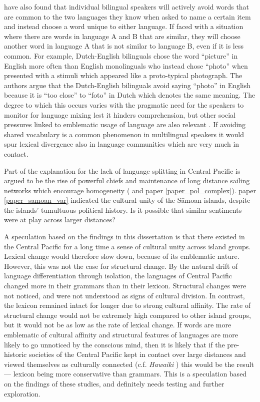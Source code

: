 \documentclass[a4paper,10pt]{article} %
\begin{document}
\cite{ellison2017language} have also found that individual bilingual speakers will actively avoid words that are common to the two languages they know when asked to name a certain item and instead choose a word unique to either language. If faced with a situation where there are words in language A and B that are similar, they will choose another word in language A that is not similar to language B, even if it is less common. For example, Dutch-English bilinguals chose the word ``picture'' in English more often than English monolinguals who instead chose ``photo'' when presented with a stimuli which appeared like a proto-typical photograph. The authors argue that the Dutch-English bilinguals avoid saying ``photo'' in English because it is ``too close'' to ``foto'' in Dutch which denotes the same meaning. The degree to which this occurs varies with the pragmatic need for the speakers to monitor for language mixing lest it hinders comprehension, but other social pressures linked to emblematic usage of language are also relevant  \cite[277]{ellison2017language}. If avoiding shared vocabulary is a common phenomenon in multilingual speakers it would spur lexical divergence also in language communities which are very much in contact.

Part of the explanation for the lack of language splitting in Central Pacific is argued to be the rise of powerful chiefs and maintenance of long distance sailing networks which encourage homogeneity (\citet{pawley2007} and paper \ref{paper_pol_complex}). paper \ref{paper_samoan_var} indicated the cultural unity of the S\={a}moan islands, despite the islands' tumultuous political history. Is it possible that similar sentiments were at play across larger distances? 

A speculation based on the findings in this dissertation is that there existed in the Central Pacific for a long time a sense of cultural unity across island groups. Lexical change would therefore slow down, because of its emblematic nature. However, this was not the case for structural change. By the natural drift of language differentiation through isolation, the languages of Central Pacific changed more in their grammars than in their lexicon. Structural changes were not noticed, and were not understood as signs of cultural division. In contrast, the lexicon remained intact for longer due to strong cultural affinity. The rate of structural change would not be extremely high compared to other island groups, but it would not be as low as the rate of lexical change. If words are more emblematic of cultural affinity and structural features of languages are more likely to go unnoticed by the conscious mind, then it is likely that if the pre-historic societies of the Central Pacific kept in contact over large distances and viewed themselves as culturally connected (c.f. \emph{Hawaiki} \citep{kirchgreen2001}) this would be the result --- lexicon being more conservative than grammars. This is a speculation based on the findings of these studies, and definitely needs testing and further exploration. 
\end{document}
